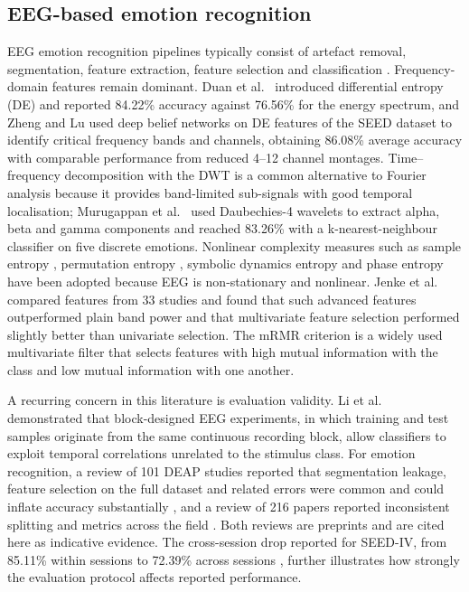 \documentclass[11pt,a4paper]{article}
\begin{document}
\subsection{EEG-based emotion recognition}
EEG emotion recognition pipelines typically consist of artefact removal, segmentation, feature extraction, feature selection and classification \cite{Alarcao2019}. Frequency-domain features remain dominant. Duan et al.\ \cite{Duan2013} introduced differential entropy (DE) and reported 84.22\% accuracy against 76.56\% for the energy spectrum, and Zheng and Lu \cite{ZhengLu2015} used deep belief networks on DE features of the SEED dataset to identify critical frequency bands and channels, obtaining 86.08\% average accuracy with comparable performance from reduced 4--12 channel montages. Time--frequency decomposition with the DWT is a common alternative to Fourier analysis because it provides band-limited sub-signals with good temporal localisation; Murugappan et al.\ \cite{Murugappan2010} used Daubechies-4 wavelets to extract alpha, beta and gamma components and reached 83.26\% with a k-nearest-neighbour classifier on five discrete emotions. Nonlinear complexity measures such as sample entropy \cite{Richman2000}, permutation entropy \cite{Bandt2002}, symbolic dynamics entropy \cite{Zebrowski2000} and phase entropy \cite{Rohila2019} have been adopted because EEG is non-stationary and nonlinear. Jenke et al.\ \cite{Jenke2014} compared features from 33 studies and found that such advanced features outperformed plain band power and that multivariate feature selection performed slightly better than univariate selection. The mRMR criterion \cite{Peng2005} is a widely used multivariate filter that selects features with high mutual information with the class and low mutual information with one another.

A recurring concern in this literature is evaluation validity. Li et al.\ \cite{Li2021} demonstrated that block-designed EEG experiments, in which training and test samples originate from the same continuous recording block, allow classifiers to exploit temporal correlations unrelated to the stimulus class. For emotion recognition, a review of 101 DEAP studies reported that segmentation leakage, feature selection on the full dataset and related errors were common and could inflate accuracy substantially \cite{Khan2025}, and a review of 216 papers reported inconsistent splitting and metrics across the field \cite{Kukhilava2025}. Both reviews are preprints and are cited here as indicative evidence. The cross-session drop reported for SEED-IV, from 85.11\% within sessions to 72.39\% across sessions \cite{Zheng2019}, further illustrates how strongly the evaluation protocol affects reported performance.
\end{document}
